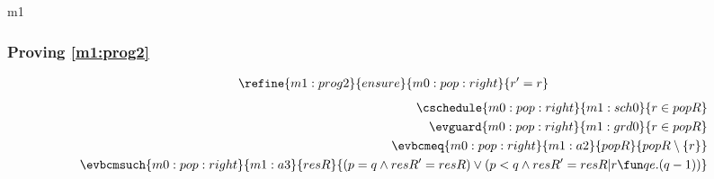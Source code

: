 \documentclass[12pt]{amsart}
\begin{document}
\begin{machine}{m1}
\subsubsection{Proving \ref{m1:prog2}}
\begin{align*}
\refine{m1:prog2}{ensure}{m0:pop:right}{ \index{r}{r' = r} }
\end{align*}
\begin{align*}
\cschedule{m0:pop:right}{m1:sch0}{ r \in popR }
\\ \evguard{m0:pop:right}{m1:grd0}{ r \in popR }
\\ \evbcmeq{m0:pop:right}{m1:a2}{popR}{ popR \setminus \{ r \} }
\\ \evbcmsuch{m0:pop:right}{m1:a3}{resR}{ (p = q \land resR' = resR) 
	\lor (p < q \land resR' = resR | r \fun qe.(q-1) ) }
\end{align*}



\end{machine}
\end{document}

